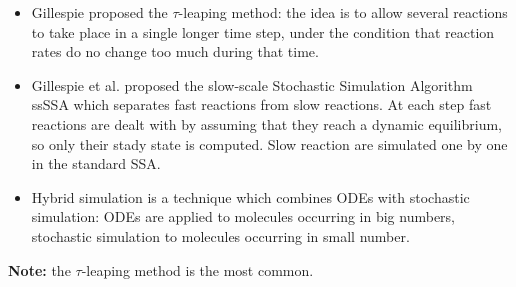 \begin{itemize}
    \item Gillespie proposed the $\tau$-leaping method: the idea is to allow several reactions to take place in a single longer time step, under the condition that reaction rates do no change too much during that time.
    \item Gillespie et al. proposed the slow-scale Stochastic Simulation Algorithm ssSSA which separates fast reactions from slow reactions. At each step fast reactions are dealt with by assuming that they reach a dynamic equilibrium, so only their stady state is computed. Slow reaction are simulated one by one in the standard SSA.
    \item Hybrid simulation is a technique which combines ODEs with stochastic simulation: ODEs are applied to molecules occurring in big numbers, stochastic simulation to molecules occurring in small number.
\end{itemize}

\textbf{Note:} the $\tau$-leaping method is the most common.

